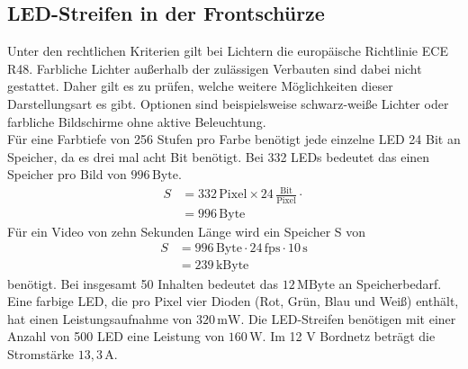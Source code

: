 \subsection{LED-Streifen in der Frontschürze}
Unter den rechtlichen Kriterien gilt bei Lichtern die europäische Richtlinie ECE R48. Farbliche Lichter außerhalb der zulässigen Verbauten sind dabei nicht gestattet. Daher gilt es zu prüfen, welche weitere Möglichkeiten dieser Darstellungsart es gibt. Optionen sind beispielsweise schwarz-weiße Lichter oder farbliche Bildschirme ohne aktive Beleuchtung. \\
Für eine Farbtiefe von 256 Stufen pro Farbe benötigt jede einzelne LED 24 Bit an Speicher, da es drei mal acht Bit benötigt. Bei 332 LEDs bedeutet das einen Speicher pro Bild von $ 996\,\mathrm{Byte} $.
\begin{align}
	S &= 332\,\mathrm{Pixel} \times 24\,\frac{\mathrm{Bit}}{\mathrm{Pixel}} \cdot \\
	&=  996\,\mathrm{Byte}
\end{align}
Für ein Video von zehn Sekunden Länge wird ein Speicher S von 
\begin{align}
	S &= 996\,\mathrm{Byte} \cdot 24\,\mathrm{fps} \cdot 10\,\mathrm{s}\\
	&= 239\,\mathrm{kByte}
\end{align}
benötigt. Bei insgesamt 50 Inhalten bedeutet das $ 12\,\mathrm{MByte} $ an Speicherbedarf. \\
Eine farbige LED, die pro Pixel vier Dioden (Rot, Grün, Blau und Weiß) enthält, hat einen Leistungsaufnahme von $ 320\,\mathrm{mW} $.  
Die LED-Streifen benötigen mit einer Anzahl von 500 LED eine Leistung von $ 160\,\mathrm{W} $. Im 12 V Bordnetz beträgt die Stromstärke $ 13,3\,\mathrm{A} $. 
